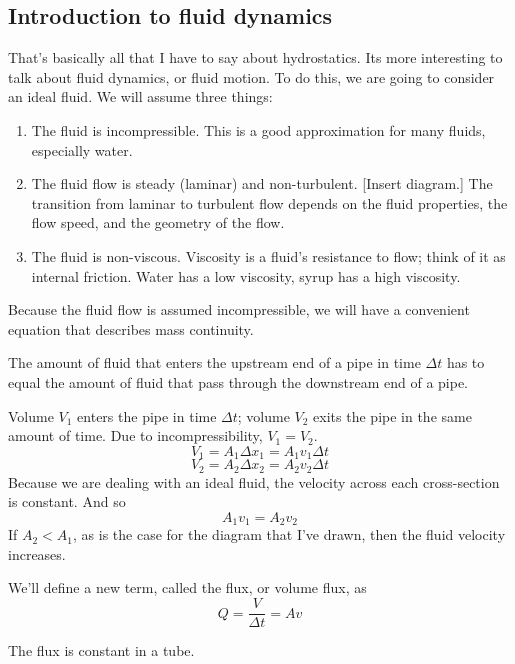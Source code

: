 \subsection{Introduction to fluid dynamics}
That's basically all that I have to say about hydrostatics. Its more interesting to talk about fluid dynamics, or fluid motion. To do this, we are going to consider an ideal fluid. We will assume three things:
\begin{enumerate}
\item The fluid is incompressible. This is a good approximation for many fluids, especially water.
\item The fluid flow is steady (laminar) and non-turbulent.
[Insert diagram.]
The transition from laminar to turbulent flow depends on the fluid properties, the flow speed, and the geometry of the flow.
\item The fluid is non-viscous. Viscosity is a fluid's resistance to flow; think of it as internal friction. Water has a low viscosity, syrup has a high viscosity.
\end{enumerate}

Because the fluid flow is assumed incompressible, we will have a convenient equation that describes mass continuity.

The amount of fluid that enters the upstream end of a pipe in time $\Delta{t}$ has to equal the amount of fluid that pass through the downstream end of a pipe.

Volume $V_1$ enters the pipe in time $\Delta{t}$; volume $V_2$ exits the pipe in the same amount of time. Due to incompressibility, $V_1=V_2$.
$$V_1=A_1\Delta{x_1}=A_1v_1\Delta{t}$$
$$V_2=A_2\Delta{x_2}=A_2v_2\Delta{t}$$
Because we are dealing with an ideal fluid, the velocity across each cross-section is constant.
And so
$$\boxed{A_1v_1=A_2v_2}$$
If $A_2<A_1$, as is the case for the diagram that I've drawn, then the fluid velocity increases.

We'll define a new term, called the flux, or volume flux, as 
$$Q=\frac{V}{\Delta{t}}=Av$$

The flux is constant in a tube.




\clearpage
